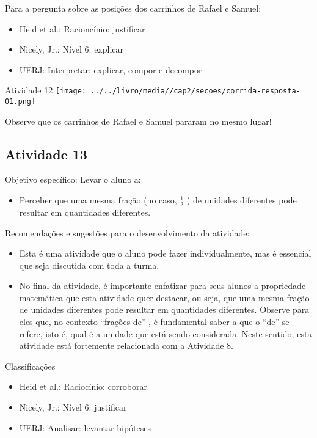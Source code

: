 \documentclass[oneside]{book}
\begin{document}
\begin{multicols}{2}
  Para a pergunta sobre as posições dos carrinhos de Rafael e Samuel:
\begin{itemize} %
    \item       Heid et al.: Racioncínio: justificar
    \item       Nicely, Jr.: Nível 6: explicar
    \item       UERJ: Interpretar: explicar, compor e decompor
\end{itemize} %


\begin{resposta*}{Atividade 12}
    \texttt{[image: ../../livro/media//cap2/secoes/corrida-resposta-01.png]}

  Observe que os carrinhos de Rafael e Samuel pararam no mesmo lugar!
\end{resposta*}



\subsection{Atividade 13}





  Objetivo específico: Levar o aluno a:
\begin{itemize} %
    \item       Perceber que uma mesma fração (no caso,       $\frac{1}{2}$      ) de unidades diferentes pode resultar em quantidades diferentes.
\end{itemize} %


  Recomendações e sugestões para o desenvolvimento da atividade:
\begin{itemize} %
    \item       Esta é uma atividade que o aluno pode fazer individualmente, mas é essencial que seja discutida com toda a turma.
    \item       No final da atividade, é importante enfatizar para seus alunos a propriedade matemática que esta atividade quer destacar, ou seja, que uma mesma fração de unidades diferentes pode resultar em quantidades diferentes. Observe para eles que, no contexto       ``frações de''      , é fundamental saber a que o       ``de''       se refere, isto é, qual é a unidade que está sendo considerada. Neste sentido, esta atividade está fortemente relacionada com a Atividade 8.
\end{itemize} %


  Classificações
\begin{itemize} %
    \item       Heid et al.: Raciocínio: corroborar
    \item       Nicely, Jr.: Nível 6: justificar
    \item       UERJ: Analisar: levantar hipóteses
\end{itemize} %



\end{multicols}
\end{document}
